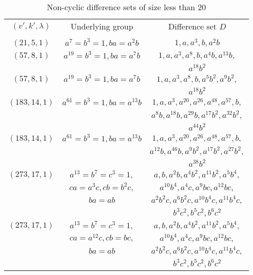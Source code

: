 \documentclass[journal,draftclsnofoot,onecolumn,12pt,twoside]{IEEEtran}
\begin{document}
\begin{table}[ht]
\small
\caption{Non-cyclic difference sets of size less than $20$ }
\centering
\begin{tabular}{c|c|c}
\hline
$(v',k',\lambda)$  & Underlying group & Difference set $D$\\
                         &                            &                             \\
  \hline
  \hline
$(21, 5, 1)$  &  $a^7=b^3=1,ba=a^2b$   & $1,a,a^3,b,a^2b$  \\

$(57,8,1)$ & $a^{19}=b^3=1,ba=a^7b$ & $1,a,a^3,a^8,b,a^4b,a^{13}b,$ \\
& &$ a^{18}b^2$\\

$(57,8,1)$ & $a^{19}=b^3=1,ba=a^7b$ & $1,a,a^3,a^8,b,a^5b^2,a^{9}b^2,$ \\
& &$ a^{18}b^2$\\
$(183,14,1)$ & $a^{61}=b^3=1,ba=a^{13}b$ & $1,a,a^3,a^{20}, a^{26}, a^{48},a^{57}, b, $\\
& & $a^8b, a^{18}b,a^{29}b,a^{17}b^2,a^{32}b^2,$\\
& & $a^{44}b^2$\\
$(183,14,1)$ & $a^{61}=b^3=1,ba=a^{13}b$ & $1,a,a^3,a^{20}, a^{26}, a^{48},a^{57}, b, $\\
& & $a^{12}b, a^{46}b,a^{9}b^2,a^{17}b^2,a^{27}b^2,$\\
& & $a^{38}b^2$\\

$(273,17,1)$ & $a^{13}=b^7=c^3=1,$ & $a,b,a^2b,a^4b^2,a^{11}b^2,a^5b^4,$ \\
& $ca=a^3c,cb=b^2c,$ & $a^{10}b^4,a^4c,a^9bc,a^{12}bc,$\\
& $ba=ab$& $a^2b^2c,a^6b^2c,a^{10}b^4c, a^{11}b^4c, $ \\
 & & $b^3c^2, b^5c^2, b^6c^2$\\

 $(273,17,1)$ & $a^{13}=b^7=c^3=1,$ & $a,b,a^2b,a^4b^2,a^{11}b^2,a^5b^4,$ \\
& $ca=a^{12}c,cb=bc,$ & $a^{10}b^4,a^4c,a^9bc,a^{12}bc,$\\
& $ba=ab$& $a^2b^2c,a^6b^2c,a^{10}b^4c, a^{11}b^4c, $ \\
 & & $b^3c^2, b^5c^2, b^6c^2$\\ \hline
 \end{tabular}
 \label{table1}
 \end{table}
\end{document}
